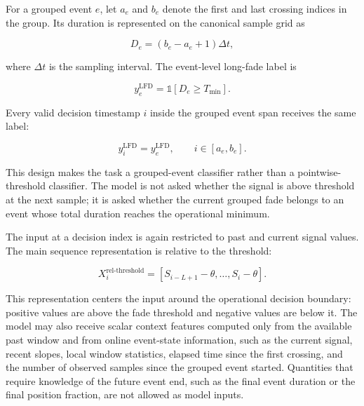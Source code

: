 For a grouped event \(e\), let \(a_e\) and \(b_e\) denote the first and last
crossing indices in the group. Its duration is represented on the canonical
sample grid as

\[
  D_e = (b_e-a_e+1)\Delta t,
\]

where \(\Delta t\) is the sampling interval. The event-level long-fade label is

\[
  y_e^{\text{LFD}}
  =
  \mathbb{1}[D_e \ge T_{\min}].
\]

Every valid decision timestamp \(i\) inside the grouped event span receives the
same label:

\[
  y_i^{\text{LFD}} = y_e^{\text{LFD}},
  \qquad i \in [a_e,b_e].
\]

This design makes the task a grouped-event classifier rather than a
pointwise-threshold classifier. The model is not asked whether the signal is
above threshold at the next sample; it is asked whether the current grouped fade
belongs to an event whose total duration reaches the operational minimum.

The input at a decision index is again restricted to past and current signal
values. The main sequence representation is relative to the threshold:

\[
  X_i^{\text{rel-threshold}}
  =
  [S_{i-L+1}-\theta,\ldots,S_i-\theta].
\]

This representation centers the input around the operational decision boundary:
positive values are above the fade threshold and negative values are below it.
The model may also receive scalar context features computed only from the
available past window and from online event-state information, such as the
current signal, recent slopes, local window statistics, elapsed time since the
first crossing, and the number of observed samples since the grouped event
started. Quantities that require knowledge of the future event end, such as the
final event duration or the final position fraction, are not allowed as model
inputs.

